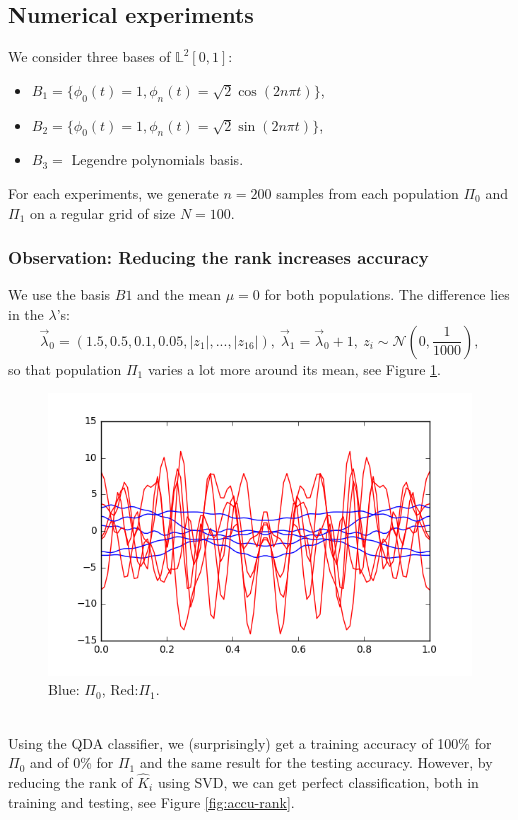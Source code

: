 \documentclass[10pt, a4paper]{article}
\theoremstyle{remark}
\begin{document}
\subsection*{Numerical experiments}
We consider three bases of $\mathbb{L}^2[0,1]$:
\begin{itemize}
	\item $B_1 = \{\phi_0(t)=1, \phi_n(t)= \sqrt{2}\cos(2n\pi t)\}$,
	\item $B_2 = \{\phi_0(t)=1, \phi_n(t)= \sqrt{2}\sin(2n\pi t)\}$,
	\item $B_3 =$ Legendre polynomials basis.
\end{itemize}
For each experiments, we generate $n=200$ samples from each population $\Pi_0$ and $\Pi_1$ on a regular grid of size $N=100$. 

\subsubsection*{Observation: Reducing the rank increases accuracy}
We use the basis $B1$ and the mean $\mu = 0$ for both populations. The difference lies in the $\lambda$'s:
$$\vec{\lambda}_0 = (1.5,0.5,0.1,0.05,|z_1|,...,|z_{16}|), \ \vec{\lambda}_1 = \vec{\lambda}_0 + 1, \ z_i \sim \mathcal{N}\left(0,\frac{1}{1000}\right),$$
so that population $\Pi_1$ varies a lot more around its mean, see Figure \ref{fig:samples}. 
\begin{figure}[h]
\centering
\includegraphics[width=0.7\linewidth]{Code/report_images/samples}
\caption{Blue: $\Pi_0$, Red:$\Pi_1$.}
\label{fig:samples}
\end{figure}\\
Using the QDA classifier, we (surprisingly) get a training accuracy of 100\% for $\Pi_0$ and of 0\% for $\Pi_1$ and the same result for the testing accuracy. However, by reducing the rank of $\hat{K}_i$ using SVD, we can get perfect classification, both in training and testing, see Figure \ref{fig:accu-rank}.
\end{document}
